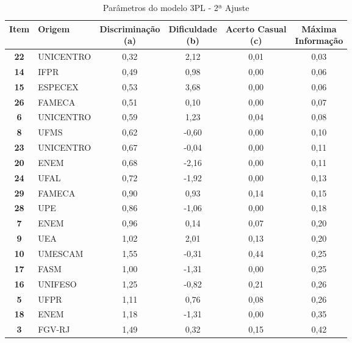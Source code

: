 \begin{table}[h]
	\centering
	\caption{Parâmetros do modelo 3PL - 2ª Ajuste}
	\label{tabela-coef3-excl}
	\begin{tabular}{clcccc}
		\hline
		\textbf{Item}  & \textbf{Origem} & 
		\makecell{\textbf{Discriminação} \\\textbf{(a)}}& 
		\makecell{\textbf{Dificuldade} \\\textbf{ (b)}} &
		\makecell{\textbf{Acerto Casual} \\\textbf{(c})} &
		\makecell{\textbf{Máxima} \\ \textbf{Informação}} 
		\\ 
		\hline \textbf{22} & UNICENTRO & 0,32 & 2,12 & 0,01 & 0,03 \\ 
		\hline \textbf{14} & IFPR & 0,49 & 0,98 & 0,00 & 0,06 \\ 
		\hline \textbf{15} & ESPECEX & 0,53 & 3,68 & 0,00 & 0,06 \\ 
		\hline \textbf{26} & FAMECA & 0,51 & 0,10 & 0,00 & 0,07 \\ 
		\hline \textbf{6 }& UNICENTRO & 0,59 & 1,23 & 0,04 & 0,08 \\ 
		\hline \textbf{8 }& UFMS & 0,62 & -0,60 & 0,00 & 0,10 \\ 
		\hline \textbf{23} & UNICENTRO & 0,67 & -0,04 & 0,00 & 0,11 \\ 
		\hline \textbf{20} & ENEM & 0,68 & -2,16 & 0,00 & 0,11 \\ 
		\hline \textbf{24} & UFAL & 0,72 & -1,92 & 0,00 & 0,13 \\ 
		\hline \textbf{29} & FAMECA & 0,90 & 0,93 & 0,14 & 0,15 \\ 
		\hline \textbf{28} & UPE & 0,86 & -1,06 & 0,00 & 0,18 \\ 
		\hline \textbf{7 }& ENEM & 0,96 & 0,14 & 0,07 & 0,20 \\ 
		\hline \textbf{9 }& UEA & 1,02 & 2,01 & 0,13 & 0,20 \\ 
		\hline \textbf{10} & UMESCAM & 1,55 & -0,31 & 0,44 & 0,25 \\ 
		\hline \textbf{17} & FASM & 1,00 & -1,31 & 0,00 & 0,25 \\ 
		\hline \textbf{16} & UNIFESO & 1,25 & -0,82 & 0,21 & 0,26 \\ 
		\hline \textbf{5 }& UFPR & 1,11 & 0,76 & 0,08 & 0,26 \\ 
		\hline \textbf{18} & ENEM & 1,18 & -1,31 & 0,00 & 0,35 \\ 
		\hline \textbf{3 }& FGV-RJ & 1,49 & 0,32 & 0,15 & 0,42 \\ 

\end{tabular}
\end{table}
